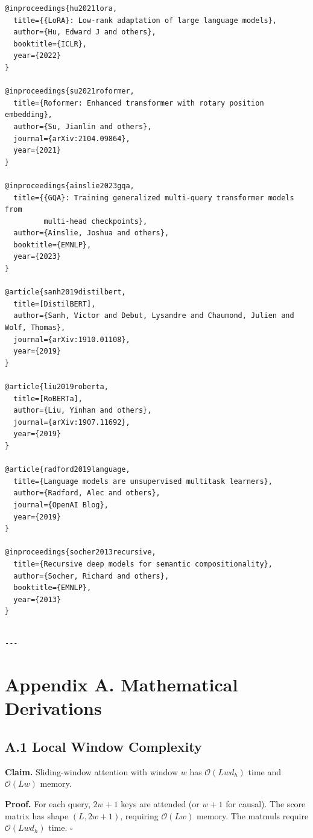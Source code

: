 \begin{lstlisting}
@inproceedings{hu2021lora,
  title={{LoRA}: Low-rank adaptation of large language models},
  author={Hu, Edward J and others},
  booktitle={ICLR},
  year={2022}
}

@inproceedings{su2021roformer,
  title={Roformer: Enhanced transformer with rotary position embedding},
  author={Su, Jianlin and others},
  journal={arXiv:2104.09864},
  year={2021}
}

@inproceedings{ainslie2023gqa,
  title={{GQA}: Training generalized multi-query transformer models from 
         multi-head checkpoints},
  author={Ainslie, Joshua and others},
  booktitle={EMNLP},
  year={2023}
}

@article{sanh2019distilbert,
  title=[DistilBERT],
  author={Sanh, Victor and Debut, Lysandre and Chaumond, Julien and Wolf, Thomas},
  journal={arXiv:1910.01108},
  year={2019}
}

@article{liu2019roberta,
  title=[RoBERTa],
  author={Liu, Yinhan and others},
  journal={arXiv:1907.11692},
  year={2019}
}

@article{radford2019language,
  title={Language models are unsupervised multitask learners},
  author={Radford, Alec and others},
  journal={OpenAI Blog},
  year={2019}
}

@inproceedings{socher2013recursive,
  title={Recursive deep models for semantic compositionality},
  author={Socher, Richard and others},
  booktitle={EMNLP},
  year={2013}
}
\end{lstlisting}
\begin{lstlisting}

---
\end{lstlisting}


\section{Appendix A. Mathematical Derivations}

\subsection{A.1 Local Window Complexity}

\textbf{Claim.} Sliding-window attention with window $w$ has $\mathcal{O}(L w d_h)$ 
time and $\mathcal{O}(L w)$ memory.

\textbf{Proof.} For each query, $2w + 1$ keys are attended (or $w + 1$ for causal). 
The score matrix has shape $(L, 2w+1)$, requiring $\mathcal{O}(L w)$ memory. 
The matmuls require $\mathcal{O}(L w d_h)$ time. $\square$


